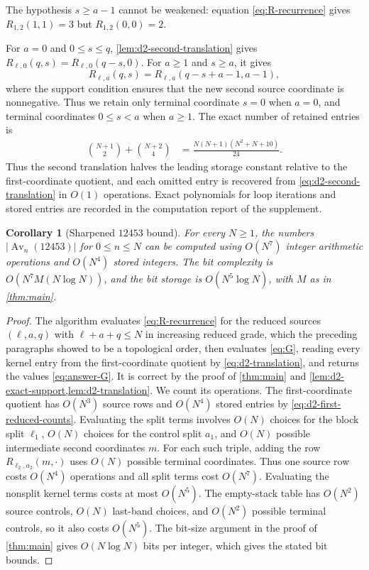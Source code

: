 \documentclass[11pt,reqno]{amsart}
\newtheorem{corollary}[corollary]{Corollary}
\theoremstyle{definition}
\theoremstyle{remark}
\newcommand{\Av}{\operatorname{Av}}
\begin{document}
The hypothesis $s\geq a-1$ cannot be weakened: equation
\eqref{eq:R-recurrence} gives $R_{1,2}(1,1)=3$ but $R_{1,2}(0,0)=2$.

For $a=0$ and $0\leq s\leq q$, \cref{lem:d2-second-translation} gives
$R_{\ell,0}(q,s)=R_{\ell,0}(q-s,0)$.  For $a\geq1$ and $s\geq a$, it gives
\[
 R_{\ell,a}(q,s)=R_{\ell,a}(q-s+a-1,a-1),
\]
where the support condition ensures that the new second source coordinate is
nonnegative.  Thus we retain only terminal coordinate $s=0$ when $a=0$, and
terminal coordinates
$0\leq s<a$ when $a\geq1$.  The exact number of retained entries is
\begin{align}
 \binom{N+1}{2}+\binom{N+2}{4}
 &=\frac{N(N+1)(N^2+N+10)}{24}.             \label{eq:d2-reduced-counts}
\end{align}
Thus the second translation halves the leading storage constant relative to
the first-coordinate quotient, and each omitted entry is recovered from
\eqref{eq:d2-second-translation} in $O(1)$ operations.  Exact polynomials for loop iterations and
stored entries are recorded in the computation report
 of the supplement.

\begin{corollary}[Sharpened $12453$ bound]\label{cor:d2-complexity}
For every $N\geq1$, the numbers $\lvert\Av_n(12453)\rvert$ for $0\leq n\leq N$
can be computed using
$O(N^7)$ integer arithmetic operations and $O(N^4)$ stored integers.
The bit complexity is $O(N^7M(N\log N))$, and the bit storage is
$O(N^5\log N)$, with $M$ as in \cref{thm:main}.
\end{corollary}

\begin{proof}
The algorithm evaluates \eqref{eq:R-recurrence} for the reduced sources
$(\ell,a,q)$ with $\ell+a+q\leq N$ in increasing reduced grade, which the
preceding paragraphs showed to be a topological order, then evaluates
\eqref{eq:G}, reading every kernel entry from the first-coordinate quotient
by \eqref{eq:d2-translation}, and returns the values \eqref{eq:answer-G}.
It is correct by the proof of \cref{thm:main} and
\cref{lem:d2-exact-support,lem:d2-translation}.  We count its operations.
The first-coordinate quotient has
$O(N^3)$ source rows and $O(N^4)$ stored entries by
\eqref{eq:d2-first-reduced-counts}.  Evaluating the split terms involves $O(N)$ choices for
the block split $\ell_1$, $O(N)$ choices for the control split $a_1$, and
$O(N)$ possible intermediate second coordinates $m$.  For each such triple,
adding the row $R_{\ell_2,a_2}(m,\mathord\cdot)$ uses $O(N)$ possible terminal
coordinates.  Thus one source row costs $O(N^4)$ operations and all split
terms cost $O(N^7)$.  Evaluating
the nonsplit kernel terms costs at most $O(N^5)$.  The empty-stack table has
$O(N^2)$ source controls, $O(N)$ last-band choices, and $O(N^2)$ possible
terminal controls, so it also costs $O(N^5)$.  The bit-size argument
in the proof of \cref{thm:main} gives $O(N\log N)$ bits per integer, which
gives the stated bit bounds.
\end{proof}
\end{document}
